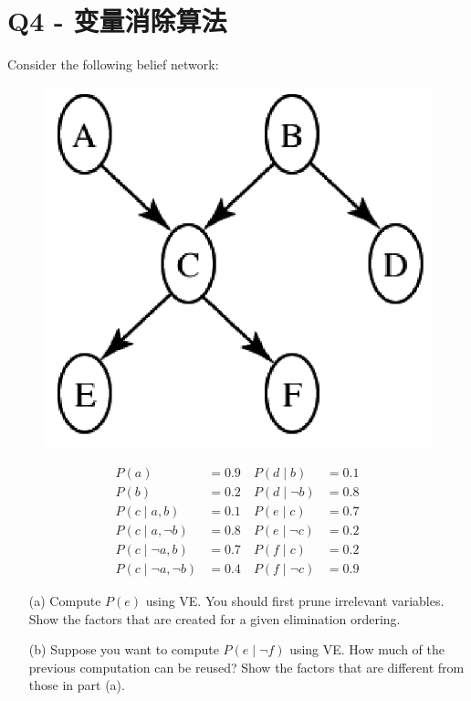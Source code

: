 \documentclass[a4paper, 11pt]{article}
\begin{document}
\begin{flushleft}
\end{flushleft}

\newpage
\section{Q4 - 变量消除算法}
\begin{question}\normalfont
Consider the following belief network:

\begin{minipage}{0.5\linewidth}
\begin{figure}[H]
\centering
\includegraphics[width=0.6\linewidth]{fig/Q4.png}
\end{figure}
\end{minipage}
\begin{minipage}{0.5\linewidth}
\[\begin{aligned}
P(a) &=0.9 \quad P(d \mid b) &=0.1 \\
P(b) &=0.2 \quad P(d \mid \neg b)&=0.8 \\
P(c \mid a, b) &=0.1 \quad P(e \mid c)&=0.7 \\
P(c \mid a,\neg b) &=0.8 \quad P(e \mid \neg c)&=0.2 \\
P(c \mid \neg a, b) &=0.7 \quad P(f \mid c)&= 0.2 \\
P(c \mid \neg a, \neg b) &=0.4 \quad P(f \mid \neg c)&= 0.9
\end{aligned}\]
\end{minipage}
\begin{itemize}
    \item [(a)] Compute $P(e)$ using VE. You should first prune irrelevant variables. Show the factors that are created for a given elimination ordering.
    \item [(b)] Suppose you want to compute $P(e\mid\lnot f)$ using VE. How much of the previous computation can be reused? Show the factors that are different from those in part (a).
\end{itemize}
\end{question}
\end{document}
